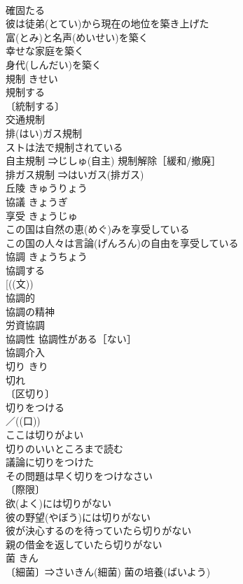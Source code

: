 \documentclass[8pt]{extreport}
\begin{document}
\begin{CJK}{UTF8}{min}
\\	確固たる　
\\	彼は徒弟(とてい)から現在の地位を築き上げた 
\\	富(とみ)と名声(めいせい)を築く 
\\	幸せな家庭を築く 
\\	身代(しんだい)を築く 
\\	規制	きせい	
\\	規制する 
\\	〔統制する〕
\\	交通規制 
\\	排(はい)ガス規制 
\\	ストは法で規制されている 
\\	自主規制 ⇒じしゅ(自主) 規制解除［緩和/撤廃］ 
\\	排ガス規制 ⇒はいガス(排ガス)
\\	丘陵	きゅうりょう	
\\	協議	きょうぎ	
\\	享受	きょうじゅ	
\\	この国は自然の恵(めぐ)みを享受している 
\\	この国の人々は言論(げんろん)の自由を享受している 
\\	協調	きょうちょう	
\\	協調する 
\\	[((文)) 
\\	協調的 
\\	協調の精神 
\\	労資協調 
\\	協調性 協調性がある［ない］ 
\\	協調介入 
\\	切り	きり	
\\	切れ 
\\	〔区切り〕
\\	切りをつける 
\\	／((口)) 
\\	ここは切りがよい 
\\	切りのいいところまで読む 
\\	議論に切りをつけた 
\\	その問題は早く切りをつけなさい 
\\	〔際限〕
\\	欲(よく)には切りがない 
\\	彼の野望(やぼう)には切りがない 
\\	彼が決心するのを待っていたら切りがない 
\\	親の借金を返していたら切りがない 
\\	菌	きん	
\\	〔細菌〕⇒さいきん(細菌) 菌の培養(ばいよう) 

\end{CJK}
\end{document}
